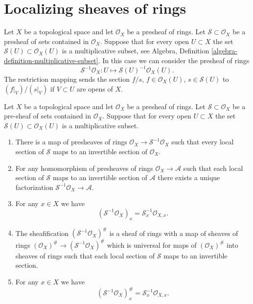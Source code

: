 \section{Localizing sheaves of rings}
\label{section-localizing-sheaves-rings}

\noindent
Let $X$ be a topological space and let $\mathcal{O}_X$ be a
presheaf of rings. Let $\mathcal{S} \subset \mathcal{O}_X$
be a presheaf of sets contained in $\mathcal{O}_X$.
Suppose that for every open $U \subset X$ the set
$\mathcal{S}(U) \subset \mathcal{O}_X(U)$ is a multiplicative subset, see
Algebra, Definition \ref{algebra-definition-multiplicative-subset}.
In this case we can consider the presheaf of rings
$$
\mathcal{S}^{-1}\mathcal{O}_X :
U \longmapsto \mathcal{S}(U)^{-1}\mathcal{O}_X(U).
$$
The restriction mapping sends the section $f/s$, $f \in \mathcal{O}_X(U)$,
$s \in \mathcal{S}(U)$ to $(f|_V)/(s|_V)$ if $V \subset U$ are opens
of $X$.

\begin{lemma}
\label{lemma-simple-invert}
Let $X$ be a topological space and let $\mathcal{O}_X$ be a
presheaf of rings. Let $\mathcal{S} \subset \mathcal{O}_X$
be a pre-sheaf of sets contained in $\mathcal{O}_X$.
Suppose that for every open $U \subset X$ the set
$\mathcal{S}(U) \subset \mathcal{O}_X(U)$ is a multiplicative subset.
\begin{enumerate}
\item There is a map of presheaves of rings
$\mathcal{O}_X \to \mathcal{S}^{-1}\mathcal{O}_X$
such that every local section of $\mathcal{S}$ maps to an invertible
section of $\mathcal{O}_X$.
\item For any homomorphism of presheaves of rings
$\mathcal{O}_X \to \mathcal{A}$ such that each local section
of $\mathcal{S}$ maps to an invertible section of $\mathcal{A}$
there exists a unique factorization
$\mathcal{S}^{-1}\mathcal{O}_X \to \mathcal{A}$.
\item For any $x \in X$ we have
$$
(\mathcal{S}^{-1}\mathcal{O}_X)_x = \mathcal{S}_x^{-1} \mathcal{O}_{X, x}.
$$
\item The sheafification $(\mathcal{S}^{-1}\mathcal{O}_X)^\#$ is a sheaf
of rings with a map of sheaves of rings
$(\mathcal{O}_X)^\# \to (\mathcal{S}^{-1}\mathcal{O}_X)^\#$
which is universal for maps of $(\mathcal{O}_X)^\#$ into sheaves
of rings such that each local section of $\mathcal{S}$ maps
to an invertible section.
\item For any $x \in X$ we have
$$
(\mathcal{S}^{-1}\mathcal{O}_X)^\#_x = \mathcal{S}_x^{-1} \mathcal{O}_{X, x}.
$$
\end{enumerate}
\end{lemma}

